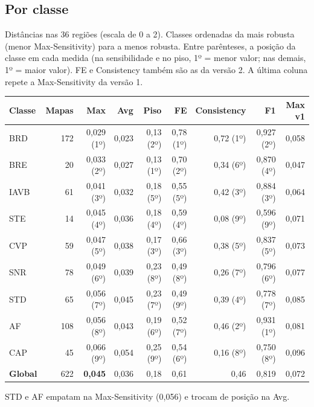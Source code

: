 \documentclass[11pt,a4paper]{article}
\begin{document}
\subsection{Por classe}
Distâncias nas 36 regiões (escala de 0 a 2). Classes ordenadas da mais robusta (menor Max-Sensitivity) para a menos robusta. Entre parênteses, a posição da classe em cada medida (na sensibilidade e no piso, 1º = menor valor; nas demais, 1º = maior valor). FE e Consistency também são as da versão 2. A última coluna repete a Max-Sensitivity da versão 1.
\begin{center}\small
\setlength{\tabcolsep}{4pt}
\begin{tabularx}{\linewidth}{Xrrrrrrrr}
\toprule
\textbf{Classe} & \textbf{Mapas} & \textbf{Max} & \textbf{Avg} & \textbf{Piso} & \textbf{FE} & \textbf{Consistency} & \textbf{F1} & \textbf{Max v1} \\
\midrule
BRD  & 172 & 0,029 (1º) & 0,023 & 0,13 (2º) & 0,78 (1º) & 0,72 (1º) & 0,927 (2º) & 0,058 \\
BRE  &  20 & 0,033 (2º) & 0,027 & 0,13 (1º) & 0,70 (2º) & 0,34 (6º) & 0,870 (4º) & 0,047 \\
IAVB &  61 & 0,041 (3º) & 0,032 & 0,18 (5º) & 0,55 (5º) & 0,42 (3º) & 0,884 (3º) & 0,064 \\
STE  &  14 & 0,045 (4º) & 0,036 & 0,18 (4º) & 0,59 (4º) & 0,08 (9º) & 0,596 (9º) & 0,071 \\
CVP  &  59 & 0,047 (5º) & 0,038 & 0,17 (3º) & 0,66 (3º) & 0,38 (5º) & 0,837 (5º) & 0,073 \\
SNR  &  78 & 0,049 (6º) & 0,039 & 0,23 (8º) & 0,49 (8º) & 0,26 (7º) & 0,796 (6º) & 0,077 \\
STD  &  65 & 0,056 (7º) & 0,045 & 0,23 (7º) & 0,49 (9º) & 0,39 (4º) & 0,778 (7º) & 0,085 \\
AF   & 108 & 0,056 (8º) & 0,043 & 0,19 (6º) & 0,52 (7º) & 0,46 (2º) & 0,931 (1º) & 0,081 \\
CAP  &  45 & 0,066 (9º) & 0,054 & 0,25 (9º) & 0,54 (6º) & 0,16 (8º) & 0,750 (8º) & 0,096 \\
\midrule
\textbf{Global} & 622 & \textbf{0,045} & 0,036 & 0,18 & 0,61 & 0,46 & 0,819 & 0,072 \\
\bottomrule
\end{tabularx}
\end{center}
STD e AF empatam na Max-Sensitivity (0,056) e trocam de posição na Avg.
\end{document}

